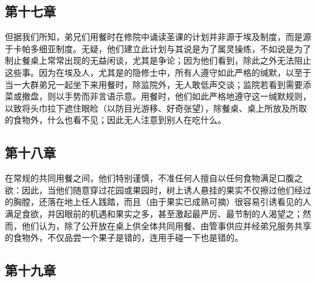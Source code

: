 
\subsection{第十七章}

\par

但据我们所知，弟兄们用餐时在修院中诵读圣课的计划并非源于埃及制度，而是源于卡帕多细亚制度。无疑，他们建立此计划与其说是为了属灵操练，不如说是为了制止餐桌上常常出现的无益闲谈，尤其是争论；因为他们看到，除此之外无法阻止这些事。因为在埃及人，尤其是的隐修士中，所有人遵守如此严格的缄默，以至于当一大群弟兄一起坐下来用餐时，除监院外，无人敢低声交谈；监院若看到需要添菜或撤盘，则以手势而非言语示意。用餐时，他们如此严格地遵守这一缄默规则，以致将头巾拉下遮住眼睑（以防目光游移、好奇张望），除餐桌、桌上所放及所取的食物外，什么也看不见；因此无人注意到别人在吃什么。\par


\subsection{第十八章}

\par

在常规的共同用餐之间，他们特别谨慎，不准任何人擅自以任何食物满足口腹之欲：因此，当他们随意穿过花园或果园时，树上诱人悬挂的果实不仅擦过他们经过的胸膛，还落在地上任人践踏，而且（由于果实已成熟可摘）很容易引诱看见的人满足食欲，并因眼前的机遇和果实之多，甚至激起最严厉、最节制的人渴望之；然而，他们认为，除了公开放在桌上供全体共同用餐、由管事供应并经弟兄服务共享的食物外，不仅品尝一个果子是错的，连用手碰一下也是错的。\par


\subsection{第十九章}

\par

